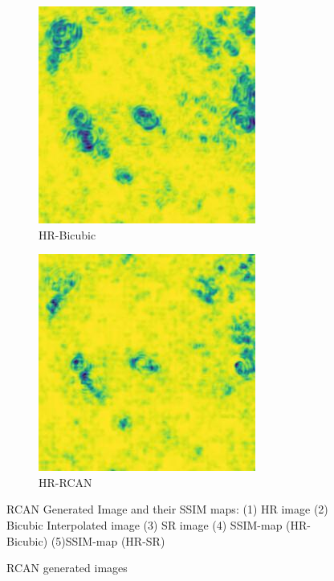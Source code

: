 \begin{figure}[H]
  \begin{subfigure}[b]{0.275\textwidth}
    \includegraphics[width=\textwidth]{Chapter7/SSIM_bicubic_9.jpg}
    \caption{HR-Bicubic}
  \end{subfigure}
  \begin{subfigure}[b]{0.275\textwidth}
    \includegraphics[width=\textwidth]{Chapter7/SSIM_rcan_9.jpg}
    \caption{HR-RCAN}
  \end{subfigure}
    \caption{RCAN generated images}{RCAN Generated Image and their SSIM maps: (1) HR image (2) Bicubic Interpolated image (3) SR image (4)  SSIM-map (HR-Bicubic) (5)SSIM-map (HR-SR) }
    \label{fig:test23}
\end{figure}

